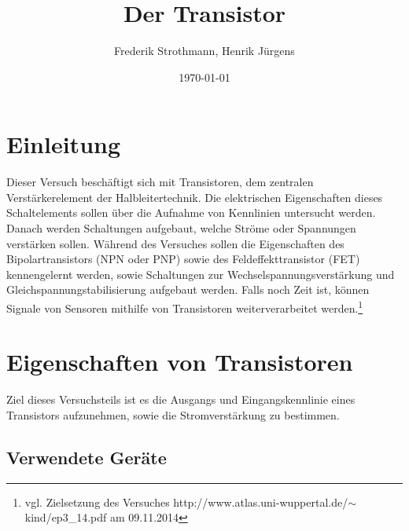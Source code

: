 \documentclass[12pt,a4paper]{article}
\title{Der Transistor}
\author{Frederik Strothmann, Henrik Jürgens}
\date{\today}
\begin{document}
\maketitle
\newpage
\tableofcontents
\newpage
\section{Einleitung}
Dieser Versuch beschäftigt sich mit Transistoren, dem zentralen Verstärkerelement der Halbleitertechnik. Die elektrischen Eigenschaften dieses Schaltelements sollen über die Aufnahme von Kennlinien untersucht werden. Danach werden Schaltungen aufgebaut, welche Ströme oder Spannungen verstärken sollen. Während des Versuches sollen die Eigenschaften des Bipolartransistors (NPN oder PNP) sowie des Feldeffekttransistor (FET) kennengelernt werden, sowie Schaltungen zur Wechselspannungsverstärkung und Gleichspannungstabilisierung aufgebaut werden. Falls noch Zeit ist, können Signale von Sensoren mithilfe von Transistoren weiterverarbeitet werden.\footnote{vgl. Zielsetzung des Versuches http://www.atlas.uni-wuppertal.de/$\sim$kind/ep3\_14.pdf am 09.11.2014}
\section{Eigenschaften von Transistoren}
Ziel dieses Versuchsteils ist es die Ausgangs und Eingangskennlinie eines Transistors aufzunehmen, sowie die Stromverstärkung zu bestimmen.
\subsection{Verwendete Geräte}
\end{document}

